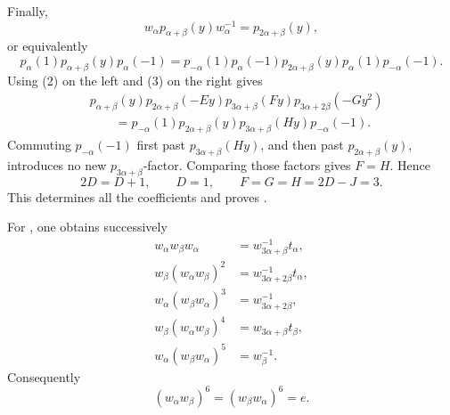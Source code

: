 Finally,
\[
  w_\alpha p_{\alpha+\beta}(y)w_\alpha^{-1}=p_{2\alpha+\beta}(y),
\]
or equivalently
\[
 p_\alpha(1)p_{\alpha+\beta}(y)p_\alpha(-1)
  =p_{-\alpha}(1)p_\alpha(-1)p_{2\alpha+\beta}(y)
    p_\alpha(1)p_{-\alpha}(-1).
\]
Using (2) on the left and (3) on the right gives
\[
\begin{aligned}
 &p_{\alpha+\beta}(y)p_{2\alpha+\beta}(-Ey)
   p_{3\alpha+\beta}(Fy)p_{3\alpha+2\beta}(-Gy^2)\\
 &\qquad=p_{-\alpha}(1)p_{2\alpha+\beta}(y)
   p_{3\alpha+\beta}(Hy)p_{-\alpha}(-1).
\end{aligned}
\]
Commuting \(p_{-\alpha}(-1)\) first past
\(p_{3\alpha+\beta}(Hy)\), and then past \(p_{2\alpha+\beta}(y)\),
introduces no new \(p_{3\alpha+\beta}\)-factor. Comparing those
factors gives \(F=H\). Hence
\[
  2D=D+1,\qquad D=1,\qquad F=G=H=2D-J=3.
\]
This determines all the coefficients and proves .

For , one obtains successively
\[
\begin{aligned}
 w_\alpha w_\beta w_\alpha
  &=w_{3\alpha+\beta}^{-1}t_\alpha,\\
 w_\beta(w_\alpha w_\beta)^2
  &=w_{3\alpha+2\beta}^{-1}t_\alpha,\\
 w_\alpha(w_\beta w_\alpha)^3
  &=w_{3\alpha+2\beta}^{-1},\\
 w_\beta(w_\alpha w_\beta)^4
  &=w_{3\alpha+\beta}t_\beta,\\
 w_\alpha(w_\beta w_\alpha)^5
  &=w_\beta^{-1}.
\end{aligned}
\]
Consequently
\[
  (w_\alpha w_\beta)^6=(w_\beta w_\alpha)^6=e.
\]

